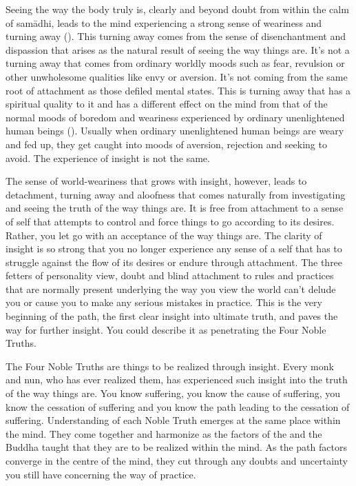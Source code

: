 Seeing the way the body truly is, clearly and beyond doubt from within the calm of sam\=adhi, leads to the mind experiencing a strong sense of weariness and turning away (). This turning away comes from the sense of disenchantment and dispassion that arises as the natural result of seeing the way things are. It's not a turning away that comes from ordinary worldly moods such as fear, revulsion or other unwholesome qualities like envy or aversion. It's not coming from the same root of attachment as those defiled mental states. This is turning away that has a spiritual quality to it and has a different effect on the mind from that of the normal moods of boredom and weariness experienced by ordinary unenlightened human beings (). Usually when ordinary unenlightened human beings are weary and fed up, they get caught into moods of aversion, rejection and seeking to avoid. The experience of insight is not the same. 

The sense of world-weariness that grows with insight, however, leads to detachment, turning away and aloofness that comes naturally from investigating and seeing the truth of the way things are. It is free from attachment to a sense of self that attempts to control and force things to go according to its desires. Rather, you let go with an acceptance of the way things are. The clarity of insight is so strong that you no longer experience any sense of a self that has to struggle against the flow of its desires or endure through attachment. The three fetters of personality view, doubt and blind attachment to rules and practices that are normally present underlying the way you view the world can't delude you or cause you to make any serious mistakes in practice. This is the very beginning of the path, the first clear insight into ultimate truth, and paves the way for further insight. You could describe it as penetrating the Four Noble Truths.

The Four Noble Truths are things to be realized through insight. Every monk and nun, who has ever realized them, has experienced such insight into the truth of the way things are. You know suffering, you know the cause of suffering, you know the cessation of suffering and you know the path leading to the cessation of suffering. Understanding of each Noble Truth emerges at the same place within the mind. They come together and harmonize as the factors of the  and the Buddha taught that they are to be realized within the mind. As the path factors converge in the centre of the mind, they cut through any doubts and uncertainty you still have concerning the way of practice.

